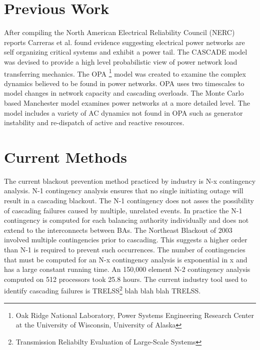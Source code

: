 \chapter{Previous Work}
After compiling the North American Electrical Reliability Council (NERC) reports Carreras et al. found evidence suggesting electrical power networks are self organizing critical systems and exhibit a power tail.\cite{carreras2000initial, carreras2001evidence} The CASCADE \cite{dobson2002examining} model was devised to provide a high level probabilistic view of power network load transferring mechanics. The OPA \cite{dobson2001initial, carreras2004complex, newman2011exploring} \footnote{Oak Ridge National Laboratory, Power Systems Engineering Research Center at the University of Wisconsin, University of Alaska} model was created to examine the complex dynamics believed to be found in power networks. OPA uses two timescales to model changes in network capacity and cascading overloads. The Monte Carlo based Manchester model examines power networks at a more detailed level. The model includes a variety of AC dynamics not found in OPA such as generator instability and re-dispatch of active and reactive resources.\cite{nedic2006criticality, baldick2009vulnerability} 

\chapter{Current Methods}
The current blackout prevention method practiced by industry is N-x contingency analysis. N-1 contingency analysis ensures that no single initiating outage will result in a cascading blackout. The N-1 contingency does not asses the possibility of cascading failures caused by multiple, unrelated events. In practice the N-1 contingency is computed for each balancing authority individually and does not extend to the interconnects between BAs. The Northeast Blackout of 2003 involved multiple contingencies prior to cascading. This suggests a higher order than N-1 is required to prevent such occurrences.\cite{baldick2009vulnerability, liscouski2004final} The number of contingencies that must be computed for an N-x contingency analysis is exponential in x and has a large constant running time. An 150,000 element N-2 contingency analysis computed on 512 processors took 25.8 hours.\cite{huang2009massive} The current industry tool used to identify cascading failures is TRELSS\footnote{Transmission Reliabilty Evaluation of Large-Scale Systems} blah blah blah TRELSS.


